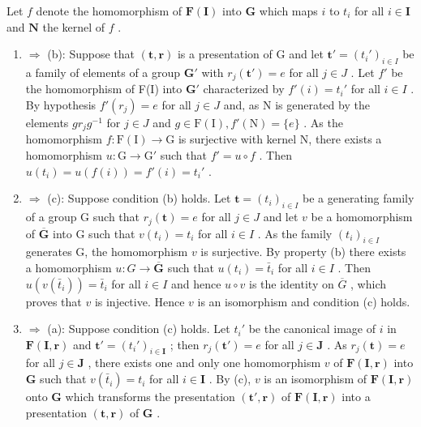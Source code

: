 Let \(f\) denote the homomorphism of \(\mathbf{F}(\mathbf{I})\) into \(\mathbf{G}\) which maps \(i\) to \(t_i\) for all \(i \in \mathbf{I}\) and \(\mathbf{N}\) the kernel of \(f\) .

\begin{enumerate}
\def\labelenumi{(\alph{enumi})}
\item
  \(\Rightarrow\) (b): Suppose that \((\mathbf{t},\mathbf{r})\) is a presentation of G and let \(\mathbf{t}' = (t_i')_{i\in I}\) be a family of elements of a group \(\mathbf{G}'\) with \(r_j(\mathbf{t}') = e\) for all \(j\in J\) . Let \(f'\) be the homomorphism of F(I) into \(\mathbf{G}'\) characterized by \(f'(i) = t_i'\) for all \(i\in I\) . By hypothesis \(f'(r_j) = e\) for all \(j\in J\) and, as N is generated by the elements \(gr_jg^{-1}\) for \(j\in J\) and \(g\in \mathrm{F}(\mathrm{I}),f'(\mathrm{N}) = \{e\}\) . As the homomorphism \(f\colon \mathrm{F}(\mathrm{I})\to \mathrm{G}\) is surjective with kernel N, there exists a homomorphism \(u\colon \mathrm{G}\to \mathrm{G}'\) such that \(f' = u\circ f\) . Then \(u(t_i) = u(f(i)) = f'(i) = t_i'\) .
\item
  \(\Rightarrow\) (c): Suppose condition (b) holds. Let \(\mathbf{t} = (t_i)_{i\in I}\) be a generating family of a group G such that \(r_j(\mathbf{t}) = e\) for all \(j\in J\) and let \(v\) be a homomorphism of \(\overline{\mathbf{G}}\) into G such that \(v(t_i) = t_i\) for all \(i\in I\) . As the family \((t_i)_{i\in I}\) generates G, the homomorphism \(v\) is surjective. By property (b) there exists a homomorphism \(u\colon G\to \overline{\mathbf{G}}\) such that \(u(t_i) = \bar{t}_i\) for all \(i\in I\) . Then \(u(v(\bar{t}_i)) = \bar{t}_i\) for all \(i\in I\) and hence \(u \circ v\) is the identity on \(\overline{G}\) , which proves that \(v\) is injective. Hence \(v\) is an isomorphism and condition (c) holds.
\item
  \(\Rightarrow\) (a): Suppose condition (c) holds. Let \(t_i'\) be the canonical image of \(i\) in \(\mathbf{F}(\mathbf{I},\mathbf{r})\) and \(\mathbf{t}' = (t_i')_{i\in \mathbf{I}}\) ; then \(r_j(\mathbf{t}') = e\) for all \(j\in \mathbf{J}\) . As \(r_j(\mathbf{t}) = e\) for all \(j\in \mathbf{J}\) , there exists one and only one homomorphism \(v\) of \(\mathbf{F}(\mathbf{I},\mathbf{r})\) into \(\mathbf{G}\) such that \(v(\bar{t}_i) = t_i\) for all \(i\in \mathbf{I}\) . By (c), \(v\) is an isomorphism of \(\mathbf{F}(\mathbf{I},\mathbf{r})\) onto \(\mathbf{G}\) which transforms the presentation \((\mathbf{t}',\mathbf{r})\) of \(\mathbf{F}(\mathbf{I},\mathbf{r})\) into a presentation \((\mathbf{t},\mathbf{r})\) of \(\mathbf{G}\) .
\end{enumerate}

